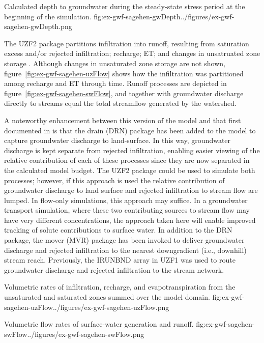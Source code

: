 \begin{StandardFigure}
	{Calculated depth to groundwater during the steady-state stress period at the beginning of the simulation.}
	{fig:ex-gwf-sagehen-gwDepth}{../figures/ex-gwf-sagehen-gwDepth.png}
\end{StandardFigure}

The UZF2 package partitions infiltration into runoff, resulting from saturation excess and/or rejected infiltration; recharge; ET; and changes in unsatruated zone storage \cite{modflow6software}.  Although changes in unsaturated zone storage are not shown, figure~\ref{fig:ex-gwf-sagehen-uzFlow} shows how the infiltration was partitioned among recharge and ET through time.  Runoff processes are depicted in figure~\ref{fig:ex-gwf-sagehen-swFlow}, and together with groundwater discharge directly to streams equal the total streamflow generated by the watershed.  

A noteworthy enhancement between this version of the model and that first documented in \citep{UZF} is that the drain (DRN) package has been added to the model to capture groundwater discharge to land-surface.  In this way, groundwater discharge is kept separate from rejected infiltration, enabling easier viewing of the relative contribution of each of these processes since they are now separated in the calculated model budget.  The UZF2 package could be used to simulate both processes; however, if this approach is used the relative contribution of groundwater discharge to land surface and rejected infiltration to stream flow are lumped.  In flow-only simulations, this approach may suffice.  In a groundwater transport simulation, where these two contributing sources to stream flow may have very different concentrations, the approach taken here will enable improved tracking of solute contributions to surface water.  In addition to the DRN package, the mover (MVR) package has been invoked to deliver groundwater discharge and rejected infiltration to the nearest downgradient (i.e., downhill) stream reach.  Previously, the IRUNBND array in UZF1 was used to route groundwater discharge and rejected infiltration to the stream network.

\begin{StandardFigure}
	{Volumetric rates of infiltration, recharge, and evapotranspiration from the unsaturated and saturated zones summed over the model domain.}
	{fig:ex-gwf-sagehen-uzFlow}{../figures/ex-gwf-sagehen-uzFlow.png}
\end{StandardFigure}

\begin{StandardFigure}
	{Volumetric flow rates of surface-water generation and runoff.}
	{fig:ex-gwf-sagehen-swFlow}{../figures/ex-gwf-sagehen-swFlow.png}
\end{StandardFigure}

